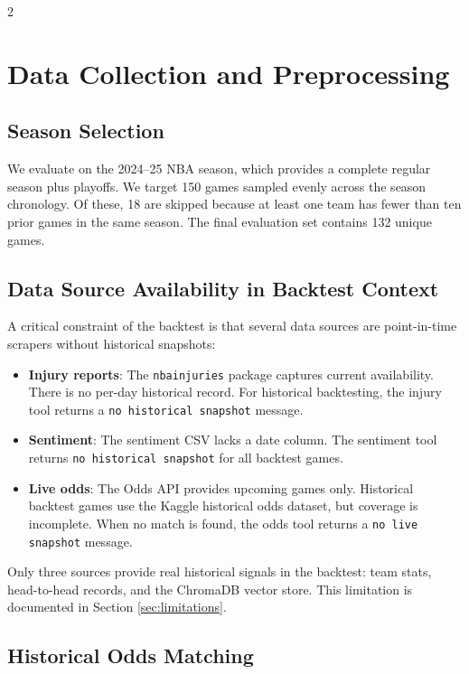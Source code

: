\documentclass[11pt]{article}
\begin{document}
\begin{multicols}{2}
\section{Data Collection and Preprocessing}

\subsection{Season Selection}

We evaluate on the 2024--25 NBA season, which provides a complete regular season plus playoffs. We target 150 games sampled evenly across the season chronology. Of these, 18 are skipped because at least one team has fewer than ten prior games in the same season. The final evaluation set contains 132 unique games.

\subsection{Data Source Availability in Backtest Context}

A critical constraint of the backtest is that several data sources are point-in-time scrapers without historical snapshots:

\begin{itemize}[leftmargin=*]
    \item \textbf{Injury reports}: The \texttt{nbainjuries} package captures current availability. There is no per-day historical record. For historical backtesting, the injury tool returns a \texttt{no historical snapshot} message.
    \item \textbf{Sentiment}: The sentiment CSV lacks a date column. The sentiment tool returns \texttt{no historical snapshot} for all backtest games.
    \item \textbf{Live odds}: The Odds API provides upcoming games only. Historical backtest games use the Kaggle historical odds dataset, but coverage is incomplete. When no match is found, the odds tool returns a \texttt{no live snapshot} message.
\end{itemize}

Only three sources provide real historical signals in the backtest: team stats, head-to-head records, and the ChromaDB vector store. This limitation is documented in Section \ref{sec:limitations}.

\subsection{Historical Odds Matching}


\end{multicols}
\end{document}
